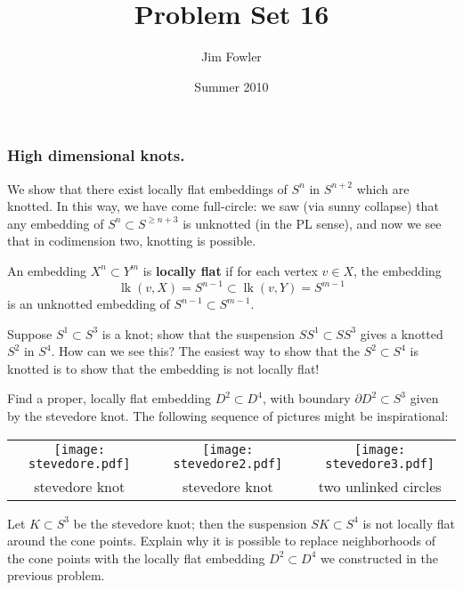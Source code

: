 \documentclass[12pt]{pset}
\title{Problem Set 16}
\author{Jim Fowler}
\date{Summer 2010}
\DeclareMathOperator{\lk}{lk}
\begin{document}
\maketitle


\subsubsection*{High dimensional knots.}  We show that there exist
locally flat embeddings of $S^n$ in $S^{n+2}$ which are knotted.  In
this way, we have come full-circle: we saw (via sunny collapse) that
any embedding of $S^n \subset S^{\geq n+3}$ is unknotted (in the PL
sense), and now we see that in codimension two, knotting is possible.

\begin{definition*}
  An embedding $X^n \subset Y^{m}$ is \textbf{locally flat} if for
  each vertex $v \in X$, the embedding
  $$
  \lk(v,X) = S^{n-1} \subset \lk(v,Y) = S^{m-1}
  $$
  is an unknotted embedding of $S^{n-1} \subset S^{m-1}$.
\end{definition*}

\begin{problem}
  Suppose $S^1 \subset S^3$ is a knot; show that the suspension $SS^1
  \subset SS^3$ gives a knotted $S^2$ in $S^4$.  How can we see this?
  The easiest way to show that the $S^2 \subset S^4$ is knotted is to
  show that the embedding is not locally flat!
\end{problem}

\begin{requiredproblem}
  Find a proper, locally flat embedding $D^2 \subset D^4$, with
  boundary $\partial D^2 \subset S^3$ given by the stevedore knot.  The
  following sequence of pictures might be inspirational:
  \begin{center}
  \begin{tabular}{ccc}
    \texttt{[image: stevedore.pdf]} &
    \texttt{[image: stevedore2.pdf]} &
    \texttt{[image: stevedore3.pdf]} \\
    stevedore knot &
    stevedore knot &
    two unlinked circles
  \end{tabular}
\end{center}
\end{requiredproblem}

\begin{problem}
  Let $K \subset S^3$ be the stevedore knot; then the suspension $SK
  \subset S^4$ is not locally flat around the cone points.  Explain
  why it is possible to replace neighborhoods of the cone points with
  the locally flat embedding $D^2 \subset D^4$ we constructed in the
  previous problem.
\end{problem}
\end{document}

